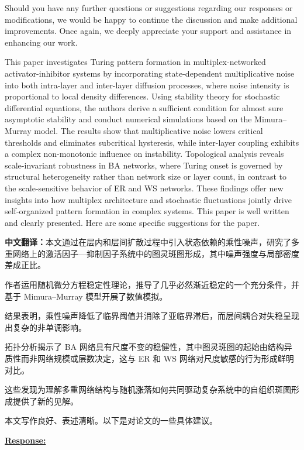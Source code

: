 \documentclass[a4paper,12pt]{article}
\newcommand{\zhtranslationfirst}[1]{%
    \par\medskip\noindent
    {\small\color{blue!60!black}\textbf{中文翻译：}#1}\par
}
\newcommand{\zhtranslation}[1]{%
    \par\smallskip\noindent
    {\small\color{blue!60!black}#1}\par
}
\begin{document}
Should you have any further questions or suggestions regarding our responses or modifications, we would be happy to continue the discussion and make additional improvements.
Once again, we deeply appreciate your support and assistance in enhancing our work.

\begin{tcolorbox}[title = {General Comment},fonttitle = \bfseries]
    This paper investigates Turing pattern formation in multiplex-networked activator-inhibitor systems by incorporating state-dependent multiplicative noise into both intra-layer and inter-layer diffusion processes, where noise intensity is proportional to local density differences. Using stability theory for stochastic differential equations, the authors derive a sufficient condition for almost sure asymptotic stability and conduct numerical simulations based on the Mimura–Murray model. The results show that multiplicative noise lowers critical thresholds and eliminates subcritical hysteresis, while inter-layer coupling exhibits a complex non-monotonic influence on instability. Topological analysis reveals scale-invariant robustness in BA networks, where Turing onset is governed by structural heterogeneity rather than network size or layer count, in contrast to the scale-sensitive behavior of ER and WS networks. These findings offer new insights into how multiplex architecture and stochastic fluctuations jointly drive self-organized pattern formation in complex systems. This paper is well written and clearly presented. Here are some specific suggestions for the paper.
    \zhtranslationfirst{本文通过在层内和层间扩散过程中引入状态依赖的乘性噪声，研究了多重网络上的激活因子—抑制因子系统中的图灵斑图形成，其中噪声强度与局部密度差成正比。}
    \zhtranslation{作者运用随机微分方程稳定性理论，推导了几乎必然渐近稳定的一个充分条件，并基于 Mimura–Murray 模型开展了数值模拟。}
    \zhtranslation{结果表明，乘性噪声降低了临界阈值并消除了亚临界滞后，而层间耦合对失稳呈现出复杂的非单调影响。}
    \zhtranslation{拓扑分析揭示了 BA 网络具有尺度不变的稳健性，其中图灵斑图的起始由结构异质性而非网络规模或层数决定，这与 ER 和 WS 网络对尺度敏感的行为形成鲜明对比。}
    \zhtranslation{这些发现为理解多重网络结构与随机涨落如何共同驱动复杂系统中的自组织斑图形成提供了新的见解。}
    \zhtranslation{本文写作良好、表述清晰。以下是对论文的一些具体建议。}
\end{tcolorbox}

\noindent \underline {\textbf{Response:}}
\bigskip
\end{document}
